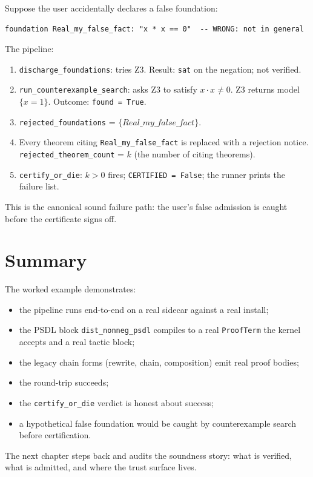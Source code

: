 Suppose the user accidentally declares a false foundation:

\begin{lstlisting}[language=deppyfile]
foundation Real_my_false_fact: "x * x == 0"  -- WRONG: not in general
\end{lstlisting}

The pipeline:
\begin{enumerate}[leftmargin=1.7em]
  \item \texttt{discharge\_foundations}: tries Z3.  Result:
    \texttt{sat} on the negation; not verified.
  \item \texttt{run\_counterexample\_search}: asks Z3 to satisfy
    $x \cdot x \neq 0$.  Z3 returns model $\{x = 1\}$.  Outcome:
    \texttt{found = True}.
  \item \texttt{rejected\_foundations} = $\{Real\_my\_false\_fact\}$.
  \item Every theorem citing \texttt{Real\_my\_false\_fact} is
    replaced with a rejection notice.  \texttt{rejected\_theorem\_count}
    = $k$ (the number of citing theorems).
  \item \texttt{certify\_or\_die}: $k > 0$ fires;
    \texttt{CERTIFIED = False}; the runner prints the failure list.
\end{enumerate}

This is the canonical sound failure path: the user's false
admission is caught before the certificate signs off.

\section{Summary}

The worked example demonstrates:
\begin{itemize}[leftmargin=1.7em]
  \item the pipeline runs end-to-end on a real sidecar against a
    real \Sympy{} install;
  \item the PSDL block \texttt{dist\_nonneg\_psdl} compiles to a
    real \texttt{ProofTerm} the kernel accepts and a real \Lean{}
    tactic block;
  \item the legacy chain forms (rewrite, chain, composition) emit
    real proof bodies;
  \item the \Lean{} round-trip succeeds;
  \item the \texttt{certify\_or\_die} verdict is honest about
    success;
  \item a hypothetical false foundation would be caught by
    counterexample search before certification.
\end{itemize}

The next chapter steps back and audits the soundness story: what
is verified, what is admitted, and where the trust surface lives.
